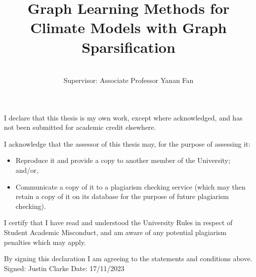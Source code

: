 \documentclass[honours,12pt]{unswthesis}
\title{Graph Learning Methods for Climate Models with Graph Sparsification}
\author{\Authornameonly\\{\bigskip}Supervisor: Associate Professor Yanan Fan}
\newcommand\blankpage{%
    \null
    \thispagestyle{empty}%
    \addtocounter{page}{-1}%
    \newpage}
\numberwithin{equation}{section}
\begin{document}
\graphicspath{ {C:/Users/jqcla/Documents/GitHub/Honours-Thesis/figures/} }

\beforepreface

\afterpage{\blankpage}



\vskip 10pc \noindent I declare that this thesis is my
own work, except where acknowledged, and has not been submitted for
academic credit elsewhere. 

\vskip 2pc  \noindent I acknowledge that the assessor of this
thesis may, for the purpose of assessing it:
\begin{itemize}
\item Reproduce it and provide a copy to another member of the University; and/or,
\item Communicate a copy of it to a plagiarism checking service (which may then retain a copy of it on its database for the purpose of future plagiarism checking).
\end{itemize}

\vskip 2pc \noindent I certify that I have read and understood the University Rules in
respect of Student Academic Misconduct, and am aware of any potential plagiarism penalties which may 
apply.\vspace{24pt}

\vskip 2pc \noindent By signing 
this declaration I am
agreeing to the statements and conditions above.
\vskip 2pc \noindent
Signed: Justin Clarke \hfill Date: 17/11/2023 \newline
\vskip 1pc

\afterpage{\blankpage}







\end{document}
